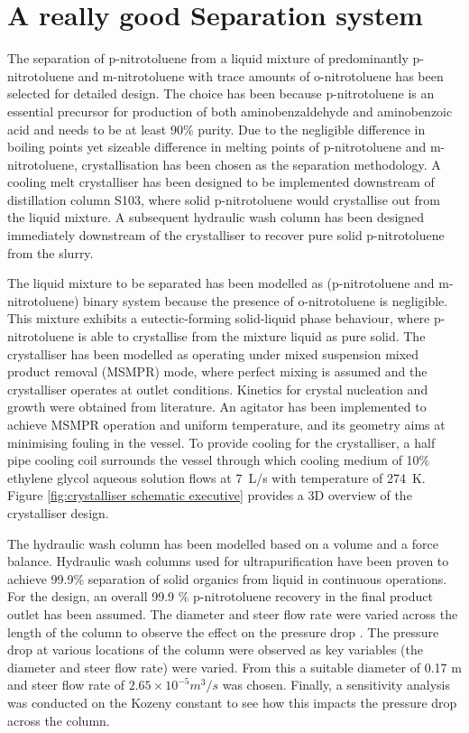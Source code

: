 \section*{A really good Separation system}

The separation of p-nitrotoluene from a liquid mixture of predominantly p-nitrotoluene and m-nitrotoluene with trace amounts of o-nitrotoluene has been selected for detailed design. The choice has been because p-nitrotoluene is an essential precursor for production of both aminobenzaldehyde and aminobenzoic acid and needs to be at least 90\% purity. Due to the negligible difference in boiling points yet sizeable difference in melting points of p-nitrotoluene and m-nitrotoluene, crystallisation has been chosen as the separation methodology. A cooling melt crystalliser has been designed to be implemented downstream of distillation column S103, where solid p-nitrotoluene would crystallise out from the liquid mixture. A subsequent hydraulic wash column has been designed immediately downstream of the crystalliser to recover pure solid p-nitrotoluene from the slurry. 


The liquid mixture to be separated has been modelled as (p-nitrotoluene and m-nitrotoluene) binary system because the presence of o-nitrotoluene is negligible. This mixture exhibits a eutectic-forming solid-liquid phase behaviour, where p-nitrotoluene is able to crystallise from the mixture liquid as pure solid. The crystalliser has been modelled as operating under mixed suspension mixed product removal (MSMPR) mode, where perfect mixing is assumed and the crystalliser operates at outlet conditions. Kinetics for crystal nucleation and growth were obtained from literature. An agitator has been implemented to achieve MSMPR operation and uniform temperature, and its geometry aims at minimising fouling in the vessel. To provide cooling for the crystalliser, a half pipe cooling coil surrounds the vessel through which cooling medium of 10\% ethylene glycol aqueous solution flows at \SI{7}{L/s} with temperature of \SI{274}{K}. Figure \ref{fig:crystalliser schematic executive} provides a 3D overview of the crystalliser design.


The hydraulic wash column has been modelled based on a volume and a force balance. Hydraulic wash columns used for ultrapurification have been proven to achieve 99.9\% separation of solid organics from liquid in continuous operations. For the design, an overall 99.9 \% p-nitrotoluene recovery in the final product outlet has been assumed. The diameter and steer flow rate were varied across the length of the column to observe the effect on the pressure drop . The pressure drop at various locations of the column were observed as key variables (the diameter and steer flow rate) were varied. From this a suitable diameter of 0.17 m and steer flow rate  of $2.65 \times 10^{-5} m^{3}/s$ was chosen. Finally, a sensitivity analysis was conducted on the Kozeny constant to see how this impacts the pressure drop across the column.


